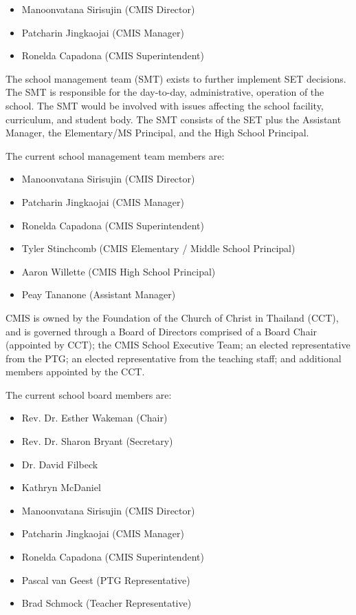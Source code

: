 \begin{itemize}
\item Manoonvatana Sirisujin (CMIS Director) 
\item Patcharin Jingkaojai (CMIS Manager) 
\item Ronelda Capadona (CMIS Superintendent) 
\end{itemize}


The school management team (SMT) exists to further implement SET decisions.  The SMT is responsible for the day-to-day, administrative, operation of the school.  The SMT would be involved with issues affecting the school facility, curriculum, and student body. The SMT consists of the SET plus the Assistant Manager, the Elementary/MS Principal, and the High School Principal. 

The current school management team members are:

\begin{itemize}
\item Manoonvatana Sirisujin (CMIS Director) 
\item Patcharin Jingkaojai (CMIS Manager) 
\item Ronelda Capadona (CMIS Superintendent)
\item Tyler Stinchcomb (CMIS Elementary / Middle School Principal)
\item Aaron Willette (CMIS High School Principal)
\item Peay Tananone (Assistant Manager)
\end{itemize}


CMIS is owned by the Foundation of the Church of Christ in Thailand (CCT), and is governed through a Board of Directors comprised of a Board Chair (appointed by CCT); the CMIS School Executive Team; an elected representative from the PTG; an elected representative from the teaching staff; and additional members appointed by the CCT.

The current school board members are: 

\begin{itemize}
\item Rev. Dr. Esther Wakeman (Chair)
\item Rev. Dr. Sharon Bryant (Secretary)
\item Dr. David Filbeck
\item Kathryn McDaniel
\item Manoonvatana Sirisujin (CMIS Director) 
\item Patcharin Jingkaojai (CMIS Manager) 
\item Ronelda Capadona (CMIS Superintendent) 
\item Pascal van Geest (PTG Representative)
\item Brad Schmock (Teacher Representative)
\end{itemize}


